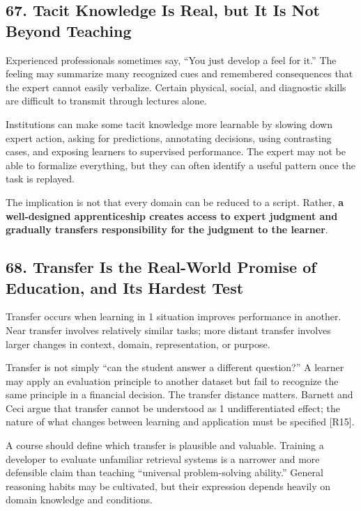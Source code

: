 \subsection*{67. Tacit Knowledge Is Real, but It Is Not Beyond Teaching}

Experienced professionals sometimes say, ``You just develop a feel for it.'' The feeling may summarize many recognized cues and remembered consequences that the expert cannot easily verbalize. Certain physical, social, and diagnostic skills are difficult to transmit through lectures alone.

Institutions can make some tacit knowledge more learnable by slowing down expert action, asking for predictions, annotating decisions, using contrasting cases, and exposing learners to supervised performance. The expert may not be able to formalize everything, but they can often identify a useful pattern once the task is replayed.

The implication is not that every domain can be reduced to a script. Rather, \textbf{a well-designed apprenticeship creates access to expert judgment and gradually transfers responsibility for the judgment to the learner}.

\subsection*{68. Transfer Is the Real-World Promise of Education, and Its Hardest Test}

Transfer occurs when learning in 1 situation improves performance in another. Near transfer involves relatively similar tasks; more distant transfer involves larger changes in context, domain, representation, or purpose.

Transfer is not simply ``can the student answer a different question?'' A learner may apply an evaluation principle to another dataset but fail to recognize the same principle in a financial decision. The transfer distance matters. Barnett and Ceci argue that transfer cannot be understood as 1 undifferentiated effect; the nature of what changes between learning and application must be specified [R15].

A course should define which transfer is plausible and valuable. Training a developer to evaluate unfamiliar retrieval systems is a narrower and more defensible claim than teaching ``universal problem-solving ability.'' General reasoning habits may be cultivated, but their expression depends heavily on domain knowledge and conditions.

